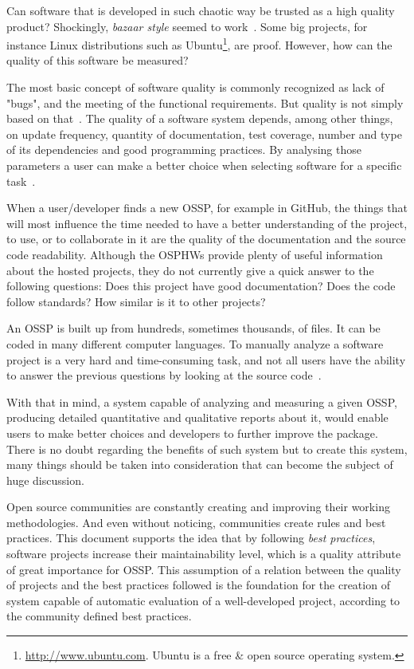 Can software that is developed in such chaotic way be trusted as a high quality product?
Shockingly, \textit{bazaar style} seemed to work~\cite{halloran2002high}.
Some big projects, for instance Linux distributions such as \textsf{Ubuntu}\footnote{\url{http://www.ubuntu.com}.
Ubuntu is a free \& open source operating system.},
are proof.
However, how can the quality of this software be measured?

The most basic concept of software quality is commonly recognized as lack of "bugs", and the meeting of the functional requirements.
But quality is not simply based on that~\cite{gousios2007software}.
The quality of a software system depends, among other things, on update frequency, quantity of documentation, test coverage,
number and type of its dependencies and good programming practices.
By analysing those parameters a user can make a better choice when selecting software for a specific task~\cite{marchenko2007predicting}.

When a user/developer finds a new OSSP, for example in
GitHub, the things that will most influence the time needed to have a better understanding of the project, to use, or to collaborate in it
are the quality of the documentation and the source code readability.
Although the OSPHWs provide plenty of useful information about the hosted projects,
they do not currently give a quick answer to the following questions:
Does this project have good documentation? Does the code follow standards? How similar is it to other projects?

An OSSP is built up from hundreds, sometimes thousands, of files. It can be coded in many different computer languages.
To manually analyze a software project is a very hard and time-consuming task,
and not all users have the ability to answer the previous questions by looking at the source code~\cite{crowston2003defining}.

With that in mind, a system capable of analyzing and measuring a given OSSP,
producing detailed quantitative and qualitative reports about it,
would enable users to make better choices and developers to further improve the package.
There is no doubt regarding the benefits of such system but
to create this system, many things should be taken into consideration that 
can become the subject of huge discussion.

Open source communities are constantly creating and improving their working methodologies.
And even without noticing, communities create rules and best practices.
This document supports the idea that by following \emph{best practices}, 
software projects increase their maintainability level,
which is a quality attribute of great importance for OSSP.
This assumption of a relation between the quality of projects and the best practices followed
is the foundation for the creation of system capable of automatic evaluation of a well-developed
project, according to the community defined best practices.

